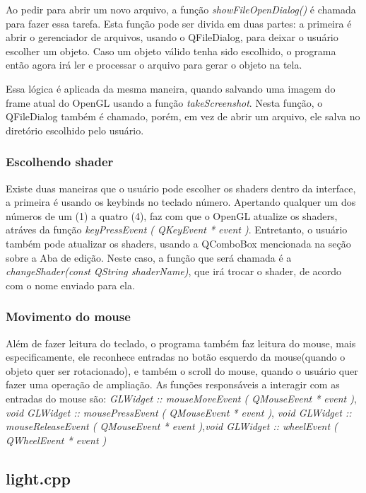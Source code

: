 Ao pedir para abrir um novo arquivo, a função \emph{showFileOpenDialog()} é chamada para fazer essa tarefa.
Esta função pode ser divida em duas partes: a primeira é abrir o gerenciador de arquivos, usando o 
QFileDialog, para deixar o usuário escolher um objeto. Caso um objeto válido tenha sido escolhido, 
o programa então agora irá ler e processar o arquivo para gerar o objeto na tela.

Essa lógica é aplicada da mesma maneira, quando salvando uma imagem do frame atual do OpenGL usando a 
função \emph{takeScreenshot}. Nesta função, o QFileDialog também é chamado, porém, em vez de abrir um 
arquivo, ele salva no diretório escolhido pelo usuário.

\subsubsection{Escolhendo shader}

Existe duas maneiras que o usuário pode escolher os shaders dentro da interface, a primeira é usando 
os keybinds no teclado número. Apertando qualquer um dos números de um (1) a quatro (4), faz com que o 
OpenGL atualize os shaders, atráves da função \emph{keyPressEvent ( QKeyEvent * event )}. Entretanto, 
o usuário também pode atualizar os shaders, usando a QComboBox mencionada na seção sobre a Aba de edição.
Neste caso, a função que será chamada é a \emph{changeShader(const QString shaderName)}, que irá trocar 
o shader, de acordo com o nome enviado para ela.

\subsubsection{Movimento do mouse}

Além de fazer leitura do teclado, o programa também faz leitura do mouse, mais especificamente, ele 
reconhece entradas no botão esquerdo da mouse(quando o objeto quer ser rotacionado), e também o scroll do mouse, 
quando o usuário quer fazer uma operação de ampliação. As funções responsáveis a interagir com as entradas do mouse
são: \emph{GLWidget :: mouseMoveEvent ( QMouseEvent * event )}, \emph{void GLWidget :: mousePressEvent ( QMouseEvent * event )},
\emph{void GLWidget :: mouseReleaseEvent ( QMouseEvent * event )},\emph{void GLWidget :: wheelEvent ( QWheelEvent * event )}


\subsection{light.cpp}

